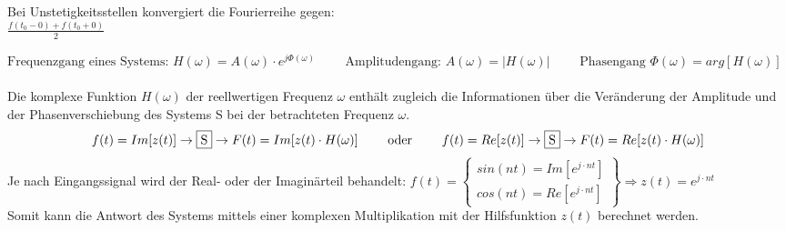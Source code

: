 Bei Unstetigkeitsstellen konvergiert die Fourierreihe gegen:\\
$\frac{f(t_0-0)+f(t_0+0)}{2}$

$ \text{Frequenzgang eines Systems: } H(\omega) = A(\omega) \cdot e^{j \Phi(\omega)} \qquad 
\text{ Amplitudengang: } A(\omega) = |H(\omega)| \qquad \text{ Phasengang } \Phi(\omega) = arg[H(\omega)] $ \\ \\
Die komplexe Funktion $H(\omega)$ der reellwertigen Frequenz $\omega$ enthält zugleich die Informationen über 
die Veränderung der Amplitude und der Phasenverschiebung des Systems S bei der betrachteten Frequenz $\omega$.
$$f(t) = Im[z(t)] \to \fbox{S}\to F(t) = Im[z(t) \cdot H(\omega)] \qquad \text{ oder } 
\qquad f(t) = Re[z(t)] \to \fbox{S}\to F(t) = Re[z(t) \cdot H(\omega)]$$
Je nach Eingangssignal wird der Real- oder der Imaginärteil behandelt: 
$ f(t) = 
    \left\{
    \begin{array}{l}
           sin(n t) = Im[e^{j \cdot n t}]\\
           cos(n t) = Re[e^{j \cdot n t}]
        \end{array}
    \right\}
\Longrightarrow
z(t) = e^{j \cdot n t}
$ \\

Somit kann die Antwort des Systems mittels einer komplexen Multiplikation mit der Hilfsfunktion $z(t)$ berechnet werden.
